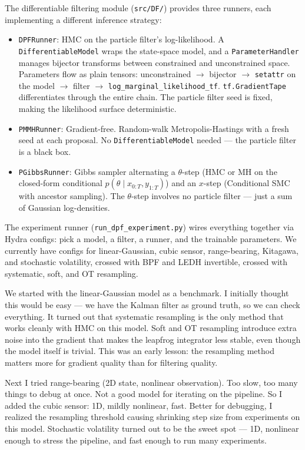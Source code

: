 \documentclass{article}
\begin{document}
The differentiable filtering module (\texttt{src/DF/}) provides three runners, each implementing a different inference strategy:
\begin{itemize}
    \item \texttt{DPFRunner}: HMC on the particle filter's log-likelihood. A \texttt{DifferentiableModel} wraps the state-space model, and a \texttt{ParameterHandler} manages bijector transforms between constrained and unconstrained space. Parameters flow as plain tensors: unconstrained $\to$ bijector $\to$ \texttt{setattr} on the model $\to$ filter $\to$ \texttt{log\_marginal\_likelihood\_tf}. \texttt{tf.GradientTape} differentiates through the entire chain. The particle filter seed is fixed, making the likelihood surface deterministic.
    \item \texttt{PMMHRunner}: Gradient-free. Random-walk Metropolis-Hastings with a fresh seed at each proposal. No \texttt{DifferentiableModel} needed --- the particle filter is a black box.
    \item \texttt{PGibbsRunner}: Gibbs sampler alternating a $\theta$-step (HMC or MH on the closed-form conditional $p(\theta \mid x_{0:T}, y_{1:T})$) and an $x$-step (Conditional SMC with ancestor sampling). The $\theta$-step involves no particle filter --- just a sum of Gaussian log-densities.
\end{itemize}
The experiment runner (\texttt{run\_dpf\_experiment.py}) wires everything together via Hydra configs: pick a model, a filter, a runner, and the trainable parameters. We currently have configs for linear-Gaussian, cubic sensor, range-bearing, Kitagawa, and stochastic volatility, crossed with BPF and LEDH invertible, crossed with systematic, soft, and OT resampling.

We started with the linear-Gaussian model as a benchmark. I initially thought this would be easy --- we have the Kalman filter as ground truth, so we can check everything. It turned out that systematic resampling is the only method that works cleanly with HMC on this model. Soft and OT resampling introduce extra noise into the gradient that makes the leapfrog integrator less stable, even though the model itself is trivial. This was an early lesson: the resampling method matters more for gradient quality than for filtering quality.

Next I tried range-bearing (2D state, nonlinear observation). Too slow, too many things to debug at once. Not a good model for iterating on the pipeline. So I added the cubic sensor: 1D, mildly nonlinear, fast. Better for debugging, I realized the resampling threshold causing shrinking step size from experiments on this model. Stochastic volatility turned out to be the sweet spot --- 1D, nonlinear enough to stress the pipeline, and fast enough to run many experiments.
\end{document}
